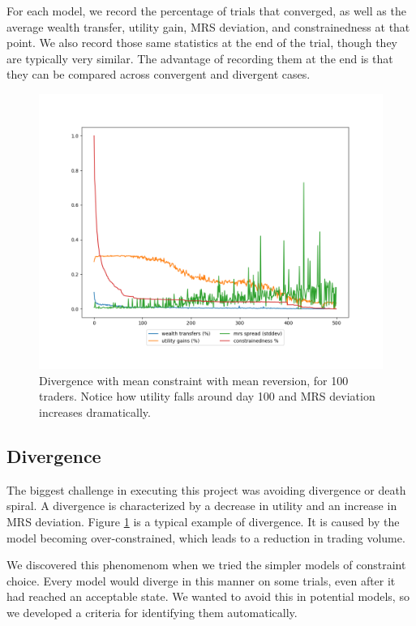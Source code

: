 \documentclass[12pt,a4paper,titlepage]{article}
\begin{document}
For each model, we record the percentage of trials that converged, as well as the average wealth transfer, utility gain, MRS deviation, and constrainedness at that point.
We also record those same statistics at the end of the trial, though they are typically very similar.
The advantage of recording them at the end is that they can be compared across convergent and divergent cases.

\begin{figure}[h]
    \centering
    \includegraphics[width=\textwidth]{seed_0.png}
    \caption{
      Divergence with mean constraint with mean reversion, for 100 traders.
      Notice how utility falls around day 100 and MRS deviation increases dramatically.
    }
    \label{fig:div}
\end{figure}

\subsection{Divergence}
The biggest challenge in executing this project was avoiding divergence or death spiral.
A divergence is characterized by a decrease in utility and an increase in MRS deviation.
Figure \ref{fig:div} is a typical example of divergence. 
It is caused by the model becoming over-constrained, which leads to a reduction in trading volume.

We discovered this phenomenom when we tried the simpler models of constraint choice.
Every model would diverge in this manner on some trials, even after it had reached an acceptable state.
We wanted to avoid this in potential models, so we developed a criteria for identifying them automatically.
\end{document}
